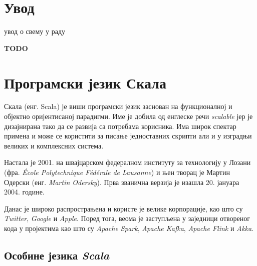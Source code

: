 \documentclass[12pt,oneside]{memoir}
\begin{document}
\frontmatter
\naslovna
\komisija
\apstrakt
\tableofcontents*

\mainmatter


\chapter{Увод}
\label{chp:uvod}

увод о свему у раду

\textbf{TODO}

\chapter{Програмски језик Скала}
\label{chp:scala}

Скала (енг. Scala) је виши програмски језик заснован на функционалној и објектно оријентисаној парадигми. Име је добила од енглеске речи \textit{scalable} јер је дизајнирана тако да се развија са потребама корисника. Има широк спектар примена и може се користити за писање једноставних скрипти али и у изградњи великих и комплексних система. \cite{scala_prog}

Настала је 2001. на швајцарском федералном институту за технологију у Лозани (фра. \textit{École Polytechnique Fédérale de Lausanne}) и њен творац је Мартин Одерски (енг. \textit{Martin Odersky}). Прва званична верзија је изашла 20. јануара 2004. године.

Данас је широко распрострањена и користе је велике корпорације, као што су \textit{Twitter}, \textit{Google} и \textit{Apple}. Поред тога, веома је заступљена у заједници отвореног кода у пројектима као што су \textit{Apache Spark}, \textit{Apache Kafka}, \textit{Apache Flink} и \textit{Akka}.

\section{Особине језика \textit{Scala}}
\label{sec:osоб_scala}
\end{document}
